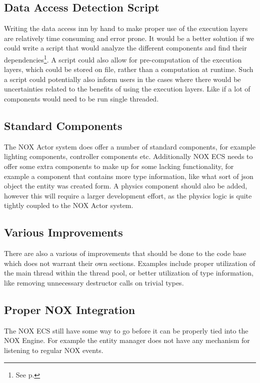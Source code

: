 \subsection{Data Access Detection Script}
Writing the data access inn by hand to make proper use of the execution layers are relatively time consuming
and error prone.
It would be a better solution if we could write a script that would analyze the different
components and find their dependencies\footnote{See p.\pageref{par:detailed_execution_layers_code_analysis}}.
A script could also allow for pre-computation of the execution layers, which could be stored on file,
rather than a computation at runtime.
Such a script could potentially also inform users in the cases where there would be uncertainties related
to the benefits of using the execution layers.
Like if a lot of components would need to be run single threaded.

\subsection{Standard Components}
The NOX Actor system does offer a number of standard components, for example lighting components,
controller components etc.
Additionally NOX ECS needs to offer some extra components to make up for some lacking functionality,
for example a component that contains more type information, like what sort of json object the entity was created form.
A physics component should also be added, however this will require a larger development effort, as the physics logic
is quite tightly coupled to the NOX Actor system.

\subsection{Various Improvements}
There are also a various of improvements that should be done to the code base which does not warrant
their own sections. Examples include proper utilization of the main thread within the thread pool,
or better utilization of type information, like removing unnecessary destructor calls on trivial types.

\subsection{Proper NOX Integration}
The NOX ECS still have some way to go before it can be properly tied into the NOX Engine.
For example the entity manager does not have any mechanism for listening to regular NOX events.

